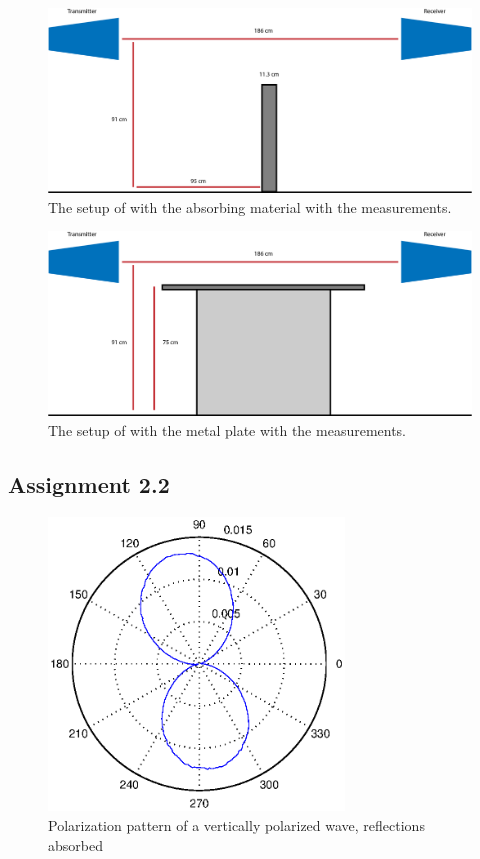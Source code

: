 \documentclass{article}
\begin{document}
\begin{figure}[H]
\centering
\includegraphics[width=\textwidth]{EM-1.png}
\caption{The setup of with the absorbing material with the measurements.}
\end{figure}

\begin{figure}[H]
\centering
\includegraphics[width=\textwidth]{EM-2.png}
\caption{The setup of with the metal plate with the measurements.}
\end{figure}


\subsection{Assignment 2.2}\label{ass22}
\begin{figure}[H]
\centering
\includegraphics[width=0.7\textwidth]{Plotjes/ass22.eps}
\caption{Polarization pattern of a vertically polarized wave, reflections absorbed}\label{fig:ass22}
\end{figure}
\end{document}
